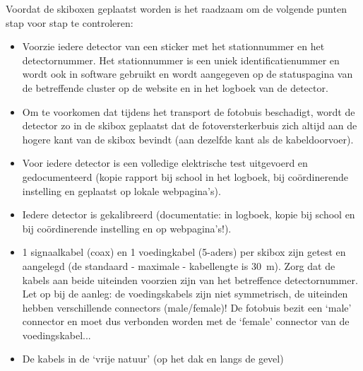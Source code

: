 
Voordat de skiboxen geplaatst worden is het raadzaam om de volgende
punten stap voor stap te controleren:

\begin{itemize}
    \item Voorzie iedere detector van een sticker met het stationnummer
    en het detectornummer. Het stationnummer is een uniek
    identificatienummer en wordt ook in software gebruikt en wordt
    aangegeven op de statuspagina van de betreffende cluster op de
    \hisparc website en in het logboek van de detector.
    \item Om te voorkomen dat tijdens het transport de fotobuis
    beschadigt, wordt de detector zo in de skibox geplaatst dat de
    fotoversterkerbuis zich altijd aan de hogere kant van de skibox
    bevindt (aan dezelfde kant als de kabeldoorvoer).
    \item Voor iedere detector is een volledige elektrische test
    uitgevoerd en gedocumenteerd (kopie rapport bij school in het
    logboek, bij coördinerende instelling en geplaatst op lokale
    webpagina’s).
    \item Iedere detector is gekalibreerd (documentatie: in logboek,
    kopie bij school en bij coördinerende instelling en op
    webpagina’s!).
    \item 1 signaalkabel (coax) en 1 voedingkabel (5-aders) per skibox
    zijn getest en aangelegd (de standaard - maximale - kabellengte is
    \SI{30}{\meter}). Zorg dat de kabels aan beide uiteinden voorzien
    zijn van het betreffence detectornummer. Let op bij de aanleg: de
    voedingskabels zijn niet symmetrisch, de uiteinden hebben
    verschillende connectors (male/female)! De fotobuis bezit een ‘male’
    connector en moet dus verbonden worden met de ‘female’ connector van
    de voedingskabel...
    \item De kabels in de ‘vrije natuur’ (op het dak en langs de gevel)

\end{itemize}
